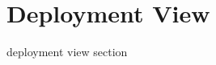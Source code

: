 \documentclass[../../../../dd.tex]{subfiles}
\begin{document}
	\section{Deployment View}

	deployment view section
	
\end{document}
